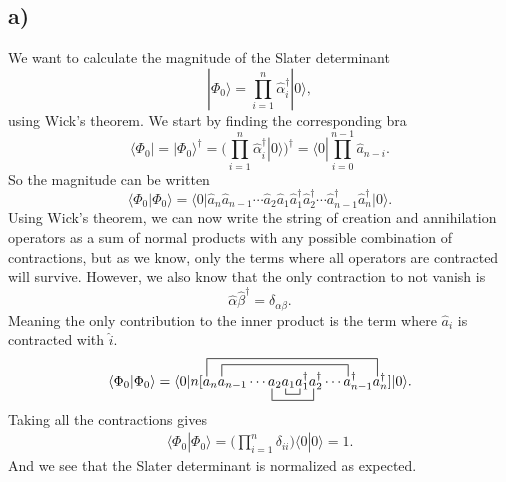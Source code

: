 \documentclass[a4paper, 11pt, notitlepage, english]{article}
\newcommand{\bra}[1]{\langle #1|}
\newcommand{\ket}[1]{|#1 \rangle}
\newcommand{\braket}[2]{\langle #1 | #2 \rangle}
\newcommand{\op}[1]{\hat{#1}}
\newcommand{\braopket}[3]{\langle #1 | {#2} | #3 \rangle}
\begin{document}
\subsection*{a)}
We want to calculate the magnitude of the Slater determinant
$$\ket{\Phi_0} = \prod_{i=1}^n \op{\alpha}_i^\dag \ket{0},$$
using Wick's theorem. We start by finding the corresponding bra
$$\bra{\Phi_0} = \ket{\Phi_0}^\dag = \bigg(\prod_{i=1}^n \op{\alpha}_i^\dag \ket{0}\bigg)^\dag = \bra{0}\prod_{i=0}^{n-1} \op{a}_{n-i}.$$
So the magnitude can be written
$$\braket{\Phi_0}{\Phi_0} = \braopket{0}{\op{a}_{n}\op{a}_{n-1}\cdots\op{a}_2\op{a}_{1}\op{a}_{1}^\dag\op{a}_{2}^\dag\cdots\op{a}_{n-1}^\dag\op{a}_{n}^\dag}{0}.$$
Using Wick's theorem, we can now write the string of creation and annihilation operators as a sum of normal products with any possible combination of contractions, but as we know, only the terms where all operators are contracted will survive. However, we also know that the only contraction to not vanish is
$$\op{\alpha}\op{\beta}^\dag = \delta_{\alpha \beta}.$$
Meaning the only contribution to the inner product is the term where $\op{a}_i$ is contracted with $\op{i}$.
\begin{align*}
\braket{\Phi_0}{\Phi_0} = \braopket{0}{n[
\contraction[3ex]{}{a}{_n{a}_{n-1}\cdots a_2{a}_{1}{a}_{1}^\dag{a}_{2}^\dag\cdots a_{n-1}^\dag}{a}
\contraction[2ex]{a_n}{a}{_{n-1}\cdots a_2{a}_{1}{a}_{1}^\dag{a}_{2}^\dag\cdots }{a}
\bcontraction[2ex]{a_n a_{n-1}\cdots }{a}{_2{a}_{1}{a}_{1}^\dag}{a}
\bcontraction[1ex]{a_n a_{n-1}\cdots a_2}{a}{_{1}}{a}
{a}_{n}{a}_{n-1}\cdots a_2 {a}_{1}{a}_{1}^\dag{a}_{2}^\dag\cdots a_{n-1}^\dag {a}_{n}^\dag]}{0}.
\end{align*}
Taking all the contractions gives
\begin{align*}
\braket{\Phi_0}{\Phi_0} = \bigg(\prod_{i=1}^n \delta_{ii}\bigg) \braket{0}{0} = 1.
\end{align*}
And we see that the Slater determinant is normalized as expected.
\end{document}
